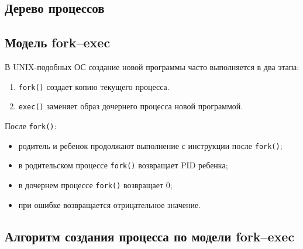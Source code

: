 \documentclass[12pt,a4paper]{article}
\begin{document}
\subsection{Дерево процессов}

\begin{center}
\end{center}

\subsection{Модель fork--exec}

В UNIX-подобных ОС создание новой программы часто выполняется в два этапа:

\begin{enumerate}
    \item \texttt{fork()} создает копию текущего процесса.
    \item \texttt{exec()} заменяет образ дочернего процесса новой программой.
\end{enumerate}

После \texttt{fork()}:
\begin{itemize}
    \item родитель и ребенок продолжают выполнение с инструкции после \texttt{fork()};
    \item в родительском процессе \texttt{fork()} возвращает PID ребенка;
    \item в дочернем процессе \texttt{fork()} возвращает $0$;
    \item при ошибке возвращается отрицательное значение.
\end{itemize}

\subsection{Алгоритм создания процесса по модели fork--exec}
\end{document}
